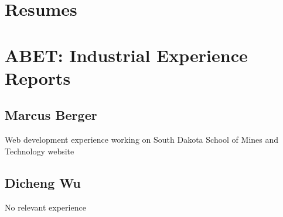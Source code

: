 

\section{Resumes}



%     

\section{ABET: Industrial Experience Reports}

\subsection{Marcus Berger}

Web development experience working on South Dakota School of Mines and Technology website

\subsection{Dicheng Wu}

No relevant experience


